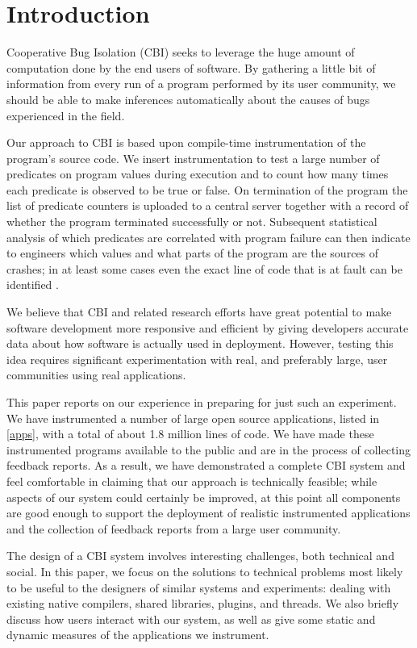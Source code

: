 \documentclass[10pt,twocolumn]{article}
\begin{document}
\section{Introduction}

Cooperative Bug Isolation (CBI) seeks to leverage the
huge amount of computation done by the end users of software.  By
gathering a little bit of information from every run of a
program performed by its user community, we should be able to make
inferences automatically about the causes of bugs experienced in the field.

Our approach to CBI is based upon compile-time instrumentation of the
program's source code.  We insert instrumentation to
test a large number of predicates on program values during
execution and to count how many times each predicate is observed to be
true or false.  On termination of the program the list of predicate
counters is uploaded to a central server together with a record of
whether the program terminated successfully or not.  Subsequent
statistical analysis of which predicates are correlated with program
failure can then indicate to engineers which values and what parts of
the program are the sources of crashes; in at least some cases even
the exact line of code that is at fault can be identified
\cite{PLDI`03*141,Liblit:2003:SUEBI,Zheng:2003:SDSP}.

We believe that CBI and related research efforts have great potential
to make software development more responsive and efficient by giving
developers accurate data about how software is actually used in
deployment.  However, testing this idea requires significant
experimentation with real, and preferably large, user communities
using real applications.

This paper reports on our experience in preparing for just such an
experiment.  We have instrumented a number of large open source
applications, listed in \autoref{apps}, with a total of about 1.8
million lines of code. We have made these instrumented programs
available to the public and are in the process of collecting feedback
reports.  As a result, we have demonstrated a complete CBI system and
feel comfortable in claiming that our approach is technically
feasible; while aspects of our system could certainly be improved, at
this point all components are good enough to support the deployment of
realistic instrumented applications and the collection of feedback
reports from a large user community.

The design of a CBI system involves interesting challenges, both
technical and social.  In this paper, we focus on the solutions to
technical problems most likely to be useful to the designers of
similar systems and experiments: dealing with existing native
compilers, shared libraries, plugins, and threads.  We also briefly
discuss how users interact with our system, as well as give some
static and dynamic measures of the applications we instrument.
\end{document}
